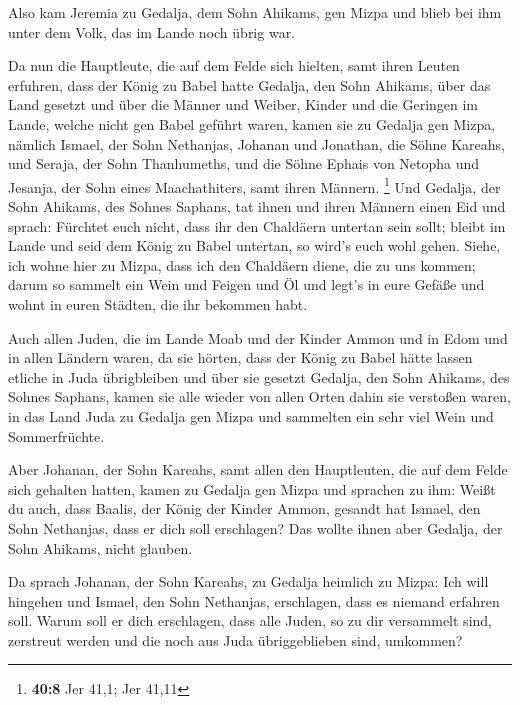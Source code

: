  Also kam Jeremia zu Gedalja, dem Sohn Ahikams, gen Mizpa
und blieb bei ihm unter dem Volk, das im Lande noch übrig war.

 Da nun die Hauptleute, die auf dem Felde sich hielten,
samt ihren Leuten erfuhren, dass der König zu Babel hatte Gedalja, den
Sohn Ahikams, über das Land gesetzt und über die Männer und Weiber,
Kinder und die Geringen im Lande, welche nicht gen Babel geführt waren,
 kamen sie zu Gedalja gen Mizpa, nämlich Ismael, der Sohn
Nethanjas, Johanan und Jonathan, die Söhne Kareahs, und Seraja, der Sohn
Thanhumeths, und die Söhne Ephais von Netopha und Jesanja, der Sohn
eines Maachathiters, samt ihren Männern. \footnote{\textbf{40:8} Jer
  41,1; Jer 41,11}  Und Gedalja, der Sohn Ahikams, des
Sohnes Saphans, tat ihnen und ihren Männern einen Eid und sprach:
Fürchtet euch nicht, dass ihr den Chaldäern untertan sein sollt; bleibt
im Lande und seid dem König zu Babel untertan, so wird's euch wohl
gehen.  Siehe, ich wohne hier zu Mizpa, dass ich den
Chaldäern diene, die zu uns kommen; darum so sammelt ein Wein und Feigen
und Öl und legt's in eure Gefäße und wohnt in euren Städten, die ihr
bekommen habt.

 Auch allen Juden, die im Lande Moab und der Kinder Ammon
und in Edom und in allen Ländern waren, da sie hörten, dass der König zu
Babel hätte lassen etliche in Juda übrigbleiben und über sie gesetzt
Gedalja, den Sohn Ahikams, des Sohnes Saphans,  kamen sie
alle wieder von allen Orten dahin sie verstoßen waren, in das Land Juda
zu Gedalja gen Mizpa und sammelten ein sehr viel Wein und Sommerfrüchte.

 Aber Johanan, der Sohn Kareahs, samt allen den
Hauptleuten, die auf dem Felde sich gehalten hatten, kamen zu Gedalja
gen Mizpa  und sprachen zu ihm: Weißt du auch, dass
Baalis, der König der Kinder Ammon, gesandt hat Ismael, den Sohn
Nethanjas, dass er dich soll erschlagen? Das wollte ihnen aber Gedalja,
der Sohn Ahikams, nicht glauben.

 Da sprach Johanan, der Sohn Kareahs, zu Gedalja heimlich
zu Mizpa: Ich will hingehen und Ismael, den Sohn Nethanjas, erschlagen,
dass es niemand erfahren soll. Warum soll er dich erschlagen, dass alle
Juden, so zu dir versammelt sind, zerstreut werden und die noch aus Juda
übriggeblieben sind, umkommen?

